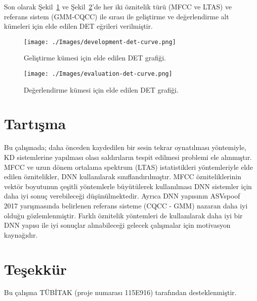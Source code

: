 \documentclass[conference, a4paper]{IEEEtran}
\begin{document}
Son olarak Şekil~\ref{DetPLot} ve Şekil~\ref{DetPLotEval}'de her iki öznitelik türü (MFCC ve LTAS) ve referans sistem
(GMM-CQCC) ile sırası ile geliştirme ve değerlendirme alt kümeleri için elde edilen DET eğrileri verilmiştir.

\begin{figure}[htbp]
    \centering
    \shorthandoff{=}
    \texttt{[image: ./Images/development-det-curve.png]}
    \shorthandon{=}
    \caption{Geliştirme kümesi için elde edilen DET grafiği.}
    \label{DetPLot}
\end{figure}
\begin{figure}[htbp]
    \centering
    \shorthandoff{=}
    \texttt{[image: ./Images/evaluation-det-curve.png]}
    \shorthandon{=}
    \caption{Değerlendirme kümesi için elde edilen DET grafiği.}
    \label{DetPLotEval}
\end{figure}

\section{Tartışma}
Bu çalışmada; daha önceden kaydedilen bir sesin tekrar oynatılması yöntemiyle, KD sistemlerine yapılması olası
saldırıların tespit edilmesi problemi ele alınmıştır. MFCC ve uzun dönem ortalama spektrum (LTAS) istatistikleri
yöntemleriyle elde edilen öznitelikler, DNN kullanılarak sınıflandırılmıştır. MFCC özniteliklerinin vektör boyutunun
çeşitli yöntemlerle büyütülerek kullanılması DNN sistemler için daha iyi sonuç verebileceği düşünülmektedir. Ayrıca
DNN yapısının ASVspoof 2017 yarışmasında belirlenen referans sisteme (CQCC - GMM) nazaran daha iyi olduğu
gözlemlenmiştir. Farklı öznitelik yöntemleri de kullanılarak daha iyi bir DNN yapısı ile iyi sonuçlar alınabileceği
gelecek çalışmalar için motivasyon kaynağıdır.

\section*{Teşekkür}
Bu çalışma TÜBİTAK (proje numarası 115E916) tarafından desteklenmiştir.



\end{document}
